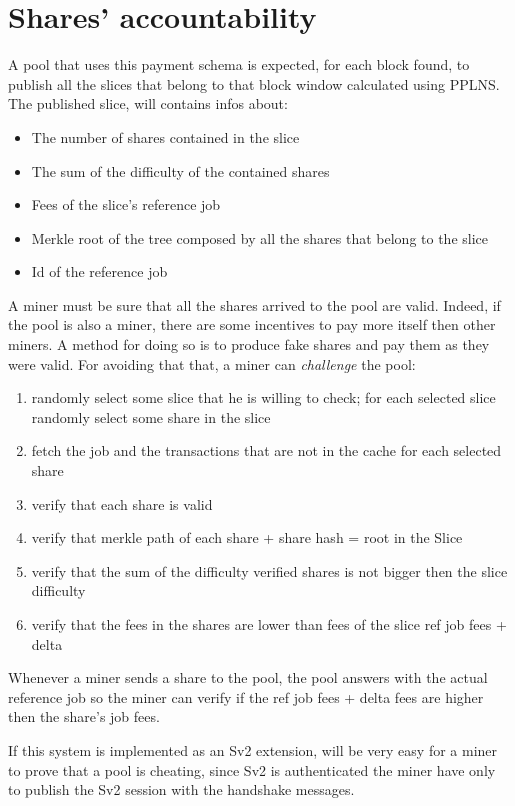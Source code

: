 \documentclass[11pt]{article} %
\begin{document}
\section{Shares' accountability}
A pool that uses this payment schema is expected, for each block found, to publish all the slices
that belong to that block window calculated using PPLNS. The published slice, will contains infos
about:
\begin{itemize}
	\item The number of shares contained in the slice
	\item The sum of the difficulty of the contained shares
	\item Fees of the slice's reference job
	\item Merkle root of the tree composed by all the shares that belong to the slice
	\item Id of the reference job
\end{itemize}
A miner must be sure that all the shares arrived to the pool are valid. Indeed, if the pool is also a miner, there are some incentives to pay more itself then other miners. A method for doing so is to produce fake shares and pay them as they were valid. For avoiding that that, a miner can \emph{challenge} the pool:
\begin{enumerate}
	\item randomly select some slice that he is willing to check; for each selected slice randomly select some share in the slice
	\item fetch the job and the transactions that are not in the cache for each selected share
	\item verify that each share is valid
	\item verify that merkle path of each share + share hash = root in the Slice
	\item verify that the sum of the difficulty verified shares is not bigger then the slice difficulty
	\item verify that the fees in the shares are lower than fees of the slice ref job fees + delta
	
\end{enumerate}
 
Whenever a miner sends a share to the pool, the pool answers with the actual reference job so the miner can verify if the ref job fees + delta fees are higher then the share's job fees.

If this system is implemented as an Sv2 extension, will be very easy for a miner to prove that a pool is cheating, since Sv2 is authenticated the miner have only to publish the Sv2 session with the handshake messages.
\appendix
\end{document}
